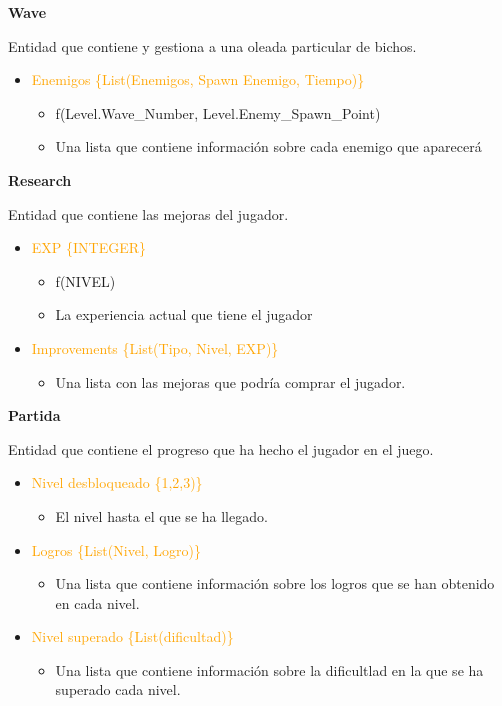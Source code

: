 \documentclass{article}
\begin{document}
\noindent \textbf{Wave}

\hfill \break \noindent Entidad que contiene y gestiona a una oleada particular de bichos.

\begin{itemize}
    \item \textcolor{Orange}{Enemigos \{List(Enemigos, Spawn Enemigo, Tiempo)\}}
    \begin{itemize}
        \item f(Level.Wave\_Number, Level.Enemy\_Spawn\_Point)
        \item Una lista que contiene información sobre cada enemigo que aparecerá
    \end{itemize}
\end{itemize}

\noindent \textbf{Research}

\hfill \break \noindent Entidad que contiene las mejoras del jugador.

\begin{itemize}
    \item \textcolor{Orange}{EXP \{INTEGER\}}
    \begin{itemize}
        \item f(NIVEL)
        \item La experiencia actual que tiene el jugador
    \end{itemize}
    \item \textcolor{Orange}{Improvements \{List(Tipo, Nivel, EXP)\}}
    \begin{itemize}
        \item Una lista con las mejoras que podría comprar el jugador.
    \end{itemize}
\end{itemize}

\noindent \textbf{Partida}

\hfill \break \noindent Entidad que contiene el progreso que ha hecho el jugador en el juego.

\begin{itemize}
    \item \textcolor{Orange}{Nivel desbloqueado \{1,2,3)\}}
    \begin{itemize}
        \item El nivel hasta el que se ha llegado.
    \end{itemize}
    \item \textcolor{Orange}{Logros \{List(Nivel, Logro)\}}
    \begin{itemize}
        \item Una lista que contiene información sobre los logros que se han obtenido en cada nivel.
    \end{itemize}
    \item \textcolor{Orange}{Nivel superado \{List(dificultad)\}}
    \begin{itemize}
        \item Una lista que contiene información sobre la dificultlad en la que se ha superado cada nivel.
    \end{itemize}
\end{itemize}
\end{document}
